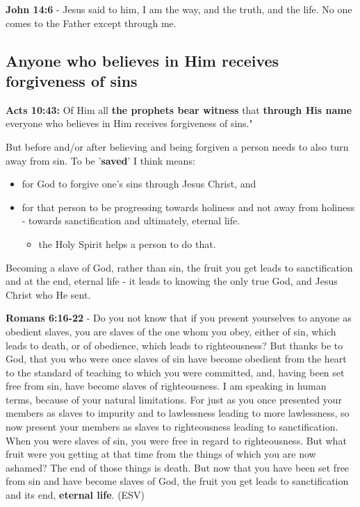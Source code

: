 \documentclass[11pt]{article}
\begin{document}
\textbf{John 14:6} - Jesus said to him, I am the way, and the truth, and the life. No one comes to the Father except through me.

\subsection{Anyone who believes in Him receives forgiveness of sins}
\label{sec:org3473d93}
\textbf{Acts 10:43:} Of Him all \textbf{the prophets bear witness} that \textbf{through His name} everyone who believes in Him receives forgiveness of sins."

But before and/or after believing and being forgiven a person needs to also turn away from sin.
To be '\textbf{saved}' I think means:
\begin{itemize}
\item for God to forgive one's sins through Jesus Christ, and
\item for that person to be progressing towards holiness and not away from holiness - towards sanctification and ultimately, eternal life.
\begin{itemize}
\item the Holy Spirit helps a person to do that.
\end{itemize}
\end{itemize}

Becoming a slave of God, rather than sin, the fruit you get leads to sanctification and at the end, eternal life - it leads to knowing the only true God, and Jesus Christ who He sent.

\textbf{Romans 6:16-22} - Do you not know that if you present yourselves to anyone as obedient slaves, you are slaves of the one whom you obey, either of sin, which leads to death, or of obedience, which leads to righteousness?  But thanks be to God, that you who were once slaves of sin have become obedient from the heart to the standard of teaching to which you were committed, and, having been set free from sin, have become slaves of righteousness.  I am speaking in human terms, because of your natural limitations.  For just as you once presented your members as slaves to impurity and to lawlessness leading to more lawlessness, so now present your members as slaves to righteousness leading to sanctification.  When you were slaves of sin, you were free in regard to righteousness.  But what fruit were you getting at that time from the things of which you are now ashamed?  The end of those things is death.  But now that you have been set free from sin and have become slaves of God, the fruit you get leads to sanctification and its end, \textbf{eternal life}.  (ESV)
\end{document}
